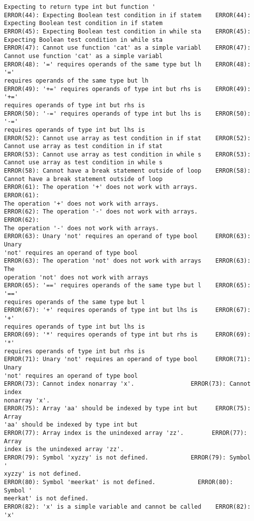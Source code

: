 \documentclass[12pt]{book}
\begin{document}
\begin{lstlisting}
Expecting to return type int but function '
ERROR(44): Expecting Boolean test condition in if statem    ERROR(44): 
Expecting Boolean test condition in if statem
ERROR(45): Expecting Boolean test condition in while sta    ERROR(45): 
Expecting Boolean test condition in while sta
ERROR(47): Cannot use function 'cat' as a simple variabl    ERROR(47): 
Cannot use function 'cat' as a simple variabl
ERROR(48): '=' requires operands of the same type but lh    ERROR(48): '=' 
requires operands of the same type but lh
ERROR(49): '+=' requires operands of type int but rhs is    ERROR(49): '+=' 
requires operands of type int but rhs is
ERROR(50): '-=' requires operands of type int but lhs is    ERROR(50): '-=' 
requires operands of type int but lhs is
ERROR(52): Cannot use array as test condition in if stat    ERROR(52): 
Cannot use array as test condition in if stat
ERROR(53): Cannot use array as test condition in while s    ERROR(53): 
Cannot use array as test condition in while s
ERROR(58): Cannot have a break statement outside of loop    ERROR(58): 
Cannot have a break statement outside of loop
ERROR(61): The operation '+' does not work with arrays.        ERROR(61): 
The operation '+' does not work with arrays.
ERROR(62): The operation '-' does not work with arrays.        ERROR(62): 
The operation '-' does not work with arrays.
ERROR(63): Unary 'not' requires an operand of type bool     ERROR(63): Unary
'not' requires an operand of type bool 
ERROR(63): The operation 'not' does not work with arrays    ERROR(63): The 
operation 'not' does not work with arrays
ERROR(65): '==' requires operands of the same type but l    ERROR(65): '==' 
requires operands of the same type but l
ERROR(67): '+' requires operands of type int but lhs is     ERROR(67): '+' 
requires operands of type int but lhs is 
ERROR(69): '*' requires operands of type int but rhs is     ERROR(69): '*' 
requires operands of type int but rhs is 
ERROR(71): Unary 'not' requires an operand of type bool     ERROR(71): Unary
'not' requires an operand of type bool 
ERROR(73): Cannot index nonarray 'x'.                ERROR(73): Cannot index
nonarray 'x'.
ERROR(75): Array 'aa' should be indexed by type int but     ERROR(75): Array
'aa' should be indexed by type int but 
ERROR(77): Array index is the unindexed array 'zz'.        ERROR(77): Array 
index is the unindexed array 'zz'.
ERROR(79): Symbol 'xyzzy' is not defined.            ERROR(79): Symbol '
xyzzy' is not defined.
ERROR(80): Symbol 'meerkat' is not defined.            ERROR(80): Symbol '
meerkat' is not defined.
ERROR(82): 'x' is a simple variable and cannot be called    ERROR(82): 'x' 

\end{lstlisting}
\end{document}
